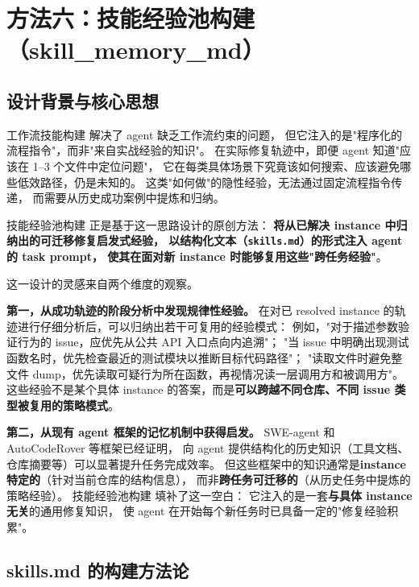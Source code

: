 \section{方法六：技能经验池构建（skill\_memory\_md）}
\label{sec:skill-memory}

\subsection{设计背景与核心思想}
\label{subsec:skill-mem-motivation}

工作流技能构建 解决了 agent 缺乏工作流约束的问题，
但它注入的是"程序化的流程指令"，而非"来自实战经验的知识"。
在实际修复轨迹中，即便 agent 知道"应该在 1--3 个文件中定位问题"，
它在每类具体场景下究竟该如何搜索、应该避免哪些低效路径，仍是未知的。
这类"如何做"的隐性经验，无法通过固定流程指令传递，
而需要从历史成功案例中提炼和归纳。

技能经验池构建 正是基于这一思路设计的原创方法：
\textbf{将从已解决 instance 中归纳出的可迁移修复启发式经验，
以结构化文本（\texttt{skills.md}）的形式注入 agent 的 task prompt，
使其在面对新 instance 时能够复用这些"跨任务经验"}。

这一设计的灵感来自两个维度的观察。

\textbf{第一，从成功轨迹的阶段分析中发现规律性经验。}
在对已 resolved instance 的轨迹进行仔细分析后，可以归纳出若干可复用的经验模式：
例如，"对于描述参数验证行为的 issue，应优先从公共 API 入口点向内追溯"；
"当 issue 中明确出现测试函数名时，优先检查最近的测试模块以推断目标代码路径"；
"读取文件时避免整文件 dump，优先读取可疑行为所在函数，再视情况读一层调用方和被调用方"。
这些经验不是某个具体 instance 的答案，而是\textbf{可以跨越不同仓库、不同 issue 类型被复用的策略模式}。

\textbf{第二，从现有 agent 框架的记忆机制中获得启发。}
SWE-agent 和 AutoCodeRover 等框架已经证明，
向 agent 提供结构化的历史知识（工具文档、仓库摘要等）可以显著提升任务完成效率。
但这些框架中的知识通常是\textbf{instance 特定的}（针对当前仓库的结构信息），
而非\textbf{跨任务可迁移的}（从历史任务中提炼的策略经验）。
技能经验池构建 填补了这一空白：
它注入的是一套\textbf{与具体 instance 无关}的通用修复知识，
使 agent 在开始每个新任务时已具备一定的"修复经验积累"。

\subsection{skills.md 的构建方法论}
\label{subsec:skills-md-construction}

